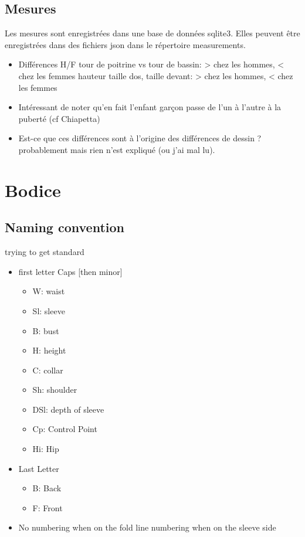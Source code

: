 \documentclass[11pt,a4paper]{report}
\begin{document}
\section{Mesures}
Les mesures sont enregistrées dans une base de données sqlite3. Elles peuvent être enregistrées dans des fichiers json dans le répertoire measurements.

\begin{itemize}

\item Différences H/F
\subitem tour de poitrine vs tour de bassin: > chez les hommes, < chez les femmes
\subitem hauteur taille dos, taille devant: > chez les hommes, < chez les femmes

\item Intéressant de noter qu'en fait l'enfant garçon passe de l'un à l'autre à la puberté (cf Chiapetta)

\item Est-ce que ces différences sont à l'origine des différences de dessin ? probablement mais rien n'est expliqué (ou j'ai mal lu).
\end{itemize}


\chapter{Bodice}

\section{Naming convention}

trying to get standard
\begin{itemize}
\item		first letter Caps [then minor]
\begin{itemize}
\item		W: waist
\item		Sl: sleeve
\item		B: bust
\item		H: height
\item		C: collar
\item		Sh: shoulder
\item		DSl: depth of sleeve
\item		Cp: Control Point
\item		Hi: Hip
\end{itemize}

\item		Last Letter
\begin{itemize}
\item		B: Back
\item		F: Front
\end{itemize}

\item		No numbering when on the fold line numbering when on the sleeve side
\end{itemize}
\end{document}
